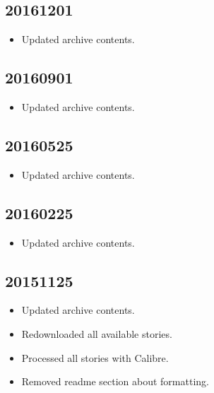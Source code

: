\documentclass[hidelinks,a4paper,12pt]{article}
\begin{document}
\subsection{20161201}  \label{sec:changelog_20161201}

\begin{itemize}
\item Updated archive contents.
\end{itemize}

\subsection{20160901}  \label{sec:changelog_20160901}

\begin{itemize}
\item Updated archive contents.
\end{itemize}

\subsection{20160525}  \label{sec:changelog_20160525}

\begin{itemize}
\item Updated archive contents.
\end{itemize}

\subsection{20160225}  \label{sec:changelog_20160225}

\begin{itemize}
\item Updated archive contents.
\end{itemize}

\subsection{20151125}  \label{sec:changelog_20151125}

\begin{itemize}
\item Updated archive contents.
\item Redownloaded all available stories.
\item Processed all stories with Calibre.
\item Removed readme section about formatting.
\end{itemize}
\end{document}
